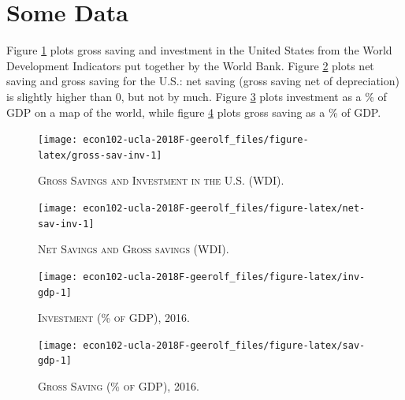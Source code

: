 \documentclass[]{book}
\begin{document}
\section{Some Data}\label{some-data}

Figure \ref{fig:gross-sav-inv} plots gross saving and investment in the
United States from the World Development Indicators put together by the
World Bank. Figure \ref{fig:net-sav-inv} plots net saving and gross
saving for the U.S.: net saving (gross saving net of depreciation) is
slightly higher than 0, but not by much. Figure \ref{fig:inv-gdp} plots
investment as a \% of GDP on a map of the world, while figure
\ref{fig:sav-gdp} plots gross saving as a \% of GDP.




\begin{figure}

{\centering \texttt{[image: econ102-ucla-2018F-geerolf\_files/figure-latex/gross-sav-inv-1]} 

}

\caption{\textsc{Gross Savings and Investment in the
U.S. (WDI)}.}\label{fig:gross-sav-inv}
\end{figure}



\begin{figure}

{\centering \texttt{[image: econ102-ucla-2018F-geerolf\_files/figure-latex/net-sav-inv-1]} 

}

\caption{\textsc{Net Savings and Gross savings (WDI)}.}\label{fig:net-sav-inv}
\end{figure}



\begin{figure}

{\centering \texttt{[image: econ102-ucla-2018F-geerolf\_files/figure-latex/inv-gdp-1]} 

}

\caption{\textsc{Investment (\% of GDP), 2016}.}\label{fig:inv-gdp}
\end{figure}



\begin{figure}

{\centering \texttt{[image: econ102-ucla-2018F-geerolf\_files/figure-latex/sav-gdp-1]} 

}

\caption{\textsc{Gross Saving (\% of GDP), 2016}.}\label{fig:sav-gdp}
\end{figure}
\end{document}
